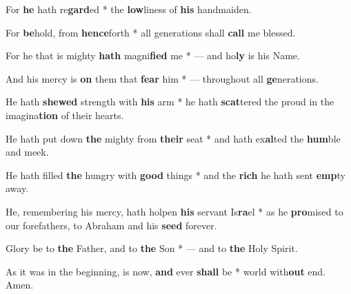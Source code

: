 \begin{multicols}{2}
	For \textbf{he} hath re\textbf{gard}ed * the \textbf{low}liness of \textbf{his} handmaiden.
	
	For \textbf{be}hold, from \textbf{hence}forth * all generations shall \textbf{call} me blessed.
	
	For he that is mighty \textbf{hath} magni\textbf{fied} me * --- and ho\textbf{ly} is his Name.
	
	And his mercy is \textbf{on} them that \textbf{fear} him * --- throughout all \textbf{ge}nerations.
	
	He hath \textbf{shewed} strength with \textbf{his} arm * he hath \textbf{scat}tered the proud in the imagina\textbf{tion} of their hearts.
	
	He hath put down \textbf{the} mighty from \textbf{their} seat * and hath ex\textbf{al}ted the \textbf{hum}ble and meek.
	
	He hath filled \textbf{the} hungry with \textbf{good} things * and the \textbf{rich} he hath sent \textbf{emp}ty away.
	
	He, remembering his mercy, hath holpen \textbf{his} servant Is\textbf{ra}el * as he \textbf{pro}mised to our forefathers, to Abraham and his \textbf{seed} forever.
	
	Glory be to \textbf{the} Father, and to \textbf{the} Son * --- and to \textbf{the} Holy Spirit.
	
	As it was in the beginning, is now, \textbf{and} ever \textbf{shall} be * world with\textbf{out} end. Amen.
\end{multicols}